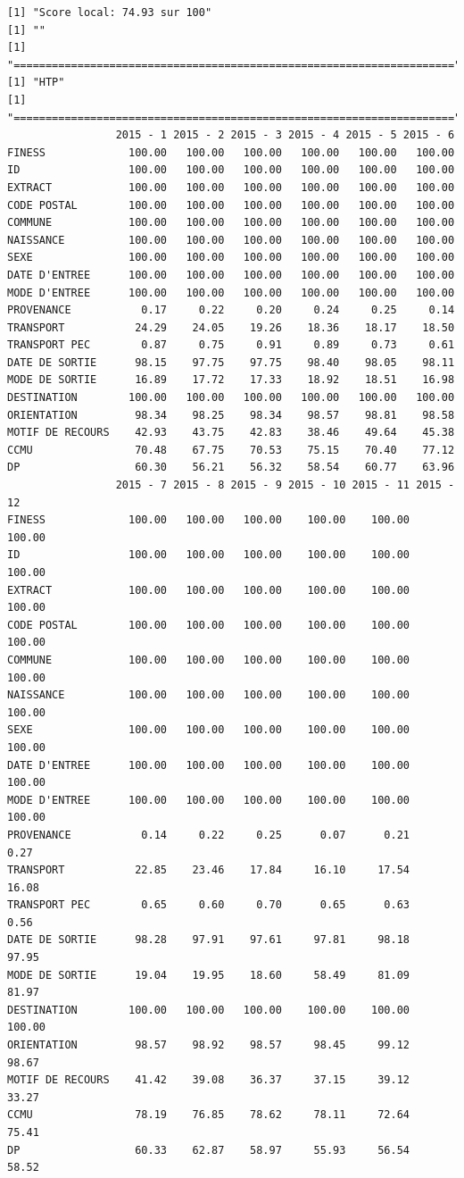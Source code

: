 \documentclass[]{article}
\begin{document}
\begin{verbatim}
[1] "Score local: 74.93 sur 100"
[1] ""
[1] "====================================================================="
[1] "HTP"
[1] "====================================================================="
                 2015 - 1 2015 - 2 2015 - 3 2015 - 4 2015 - 5 2015 - 6
FINESS             100.00   100.00   100.00   100.00   100.00   100.00
ID                 100.00   100.00   100.00   100.00   100.00   100.00
EXTRACT            100.00   100.00   100.00   100.00   100.00   100.00
CODE POSTAL        100.00   100.00   100.00   100.00   100.00   100.00
COMMUNE            100.00   100.00   100.00   100.00   100.00   100.00
NAISSANCE          100.00   100.00   100.00   100.00   100.00   100.00
SEXE               100.00   100.00   100.00   100.00   100.00   100.00
DATE D'ENTREE      100.00   100.00   100.00   100.00   100.00   100.00
MODE D'ENTREE      100.00   100.00   100.00   100.00   100.00   100.00
PROVENANCE           0.17     0.22     0.20     0.24     0.25     0.14
TRANSPORT           24.29    24.05    19.26    18.36    18.17    18.50
TRANSPORT PEC        0.87     0.75     0.91     0.89     0.73     0.61
DATE DE SORTIE      98.15    97.75    97.75    98.40    98.05    98.11
MODE DE SORTIE      16.89    17.72    17.33    18.92    18.51    16.98
DESTINATION        100.00   100.00   100.00   100.00   100.00   100.00
ORIENTATION         98.34    98.25    98.34    98.57    98.81    98.58
MOTIF DE RECOURS    42.93    43.75    42.83    38.46    49.64    45.38
CCMU                70.48    67.75    70.53    75.15    70.40    77.12
DP                  60.30    56.21    56.32    58.54    60.77    63.96
                 2015 - 7 2015 - 8 2015 - 9 2015 - 10 2015 - 11 2015 - 12
FINESS             100.00   100.00   100.00    100.00    100.00    100.00
ID                 100.00   100.00   100.00    100.00    100.00    100.00
EXTRACT            100.00   100.00   100.00    100.00    100.00    100.00
CODE POSTAL        100.00   100.00   100.00    100.00    100.00    100.00
COMMUNE            100.00   100.00   100.00    100.00    100.00    100.00
NAISSANCE          100.00   100.00   100.00    100.00    100.00    100.00
SEXE               100.00   100.00   100.00    100.00    100.00    100.00
DATE D'ENTREE      100.00   100.00   100.00    100.00    100.00    100.00
MODE D'ENTREE      100.00   100.00   100.00    100.00    100.00    100.00
PROVENANCE           0.14     0.22     0.25      0.07      0.21      0.27
TRANSPORT           22.85    23.46    17.84     16.10     17.54     16.08
TRANSPORT PEC        0.65     0.60     0.70      0.65      0.63      0.56
DATE DE SORTIE      98.28    97.91    97.61     97.81     98.18     97.95
MODE DE SORTIE      19.04    19.95    18.60     58.49     81.09     81.97
DESTINATION        100.00   100.00   100.00    100.00    100.00    100.00
ORIENTATION         98.57    98.92    98.57     98.45     99.12     98.67
MOTIF DE RECOURS    41.42    39.08    36.37     37.15     39.12     33.27
CCMU                78.19    76.85    78.62     78.11     72.64     75.41
DP                  60.33    62.87    58.97     55.93     56.54     58.52
\end{verbatim}
\end{document}
